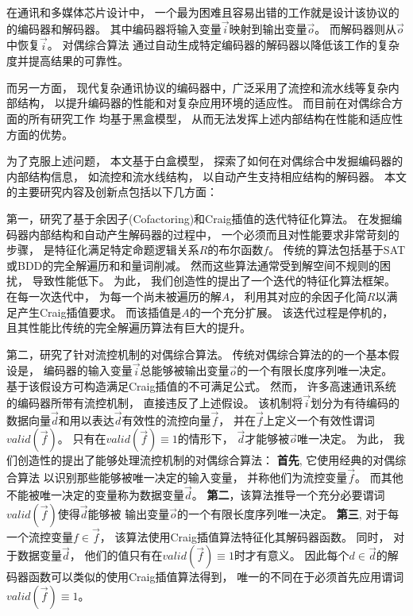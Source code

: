 \begin{cabstract}
在通讯和多媒体芯片设计中，
一个最为困难且容易出错的工作就是设计该协议的的编码器和解码器。
其中编码器将输入变量$\vec{i}$映射到输出变量$\vec{o}$。
而解码器则从$\vec{o}$中恢复$\vec{i}$。
对偶综合算法
通过自动生成特定编码器的解码器以降低该工作的复杂度并提高结果的可靠性。

而另一方面，
现代复杂通讯协议的编码器中，广泛采用了流控和流水线等复杂内部结构，
以提升编码器的性能和对复杂应用环境的适应性。
而目前在对偶综合方面的所有研究工作
均基于黑盒模型，
从而无法发挥上述内部结构在性能和适应性方面的优势。

为了克服上述问题，
本文基于白盒模型，
探索了如何在对偶综合中发掘编码器的内部结构信息，
如流控和流水线结构，
以自动产生支持相应结构的解码器。
本文的主要研究内容及创新点包括以下几方面：

第一，研究了基于余因子(Cofactoring)和Craig插值的迭代特征化算法。
在发掘编码器内部结构和自动产生解码器的过程中，
一个必须而且对性能要求非常苛刻的步骤，
是特征化满足特定命题逻辑关系$R$的布尔函数$f$。
传统的算法包括基于SAT或BDD的完全解遍历和和量词削减。
然而这些算法通常受到解空间不规则的困扰，
导致性能低下。
为此，
我们创造性的提出了一个迭代的特征化算法框架。
在每一次迭代中，
为每一个尚未被遍历的解$A$，
利用其对应的余因子化简$R$以满足产生Craig插值要求。
而该插值是$A$的一个充分扩展。
该迭代过程是停机的，
且其性能比传统的完全解遍历算法有巨大的提升。

第二，研究了针对流控机制的对偶综合算法。
传统对偶综合算法的的一个基本假设是，
编码器的输入变量$\vec{i}$总能够被输出变量$\vec{o}$的一个有限长度序列唯一决定。
基于该假设方可构造满足Craig插值的不可满足公式。
然而，
许多高速通讯系统的编码器所带有流控机制，
直接违反了上述假设。
该机制将$\vec{i}$划分为有待编码的数据向量$\vec{d}$和用以表达$\vec{d}$有效性的流控向量$\vec{f}$，
并在$\vec{f}$上定义一个有效性谓词$valid(\vec{f})$。
只有在$valid(\vec{f})\equiv 1$的情形下，
$\vec{d}$才能够被$\vec{o}$唯一决定。
为此，
我们创造性的提出了能够处理流控机制的对偶综合算法：
\textbf{首先},
它使用经典的对偶综合算法
以识别那些能够被唯一决定的输入变量，
并称他们为流控变量$\vec{f}$。
而其他不能被唯一决定的变量称为数据变量$\vec{d}$。
\textbf{第二}，该算法推导一个充分必要谓词$valid(\vec{f})$使得$\vec{d}$能够被
输出变量$\vec{o}$的一个有限长度序列唯一决定。
\textbf{第三},
对于每一个流控变量$f\in\vec{f}$，
该算法使用Craig插值算法特征化其解码器函数。
同时，
对于数据变量$\vec{d}$，
他们的值只有在$valid(\vec{f}) \equiv 1$时才有意义。
因此每个$d\in\vec{d}$的解码器函数可以类似的使用Craig插值算法得到，
唯一的不同在于必须首先应用谓词$valid(\vec{f}) \equiv 1$。




\end{cabstract}
